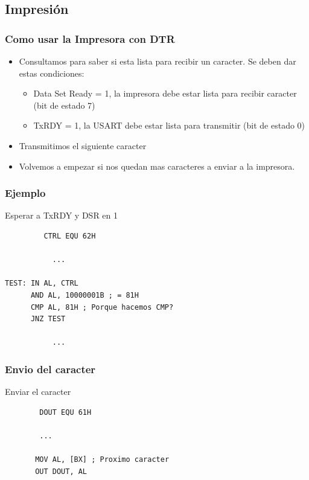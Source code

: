 \documentclass{beamer}
\begin{document}
\subsection{Impresión}

\begin{frame}[fragile]
\frametitle{Como usar la Impresora con DTR}
\begin{itemize}
 \item  Consultamos para saber si esta lista para recibir un caracter. Se deben dar estas condiciones:
 \begin{itemize}
  \item Data Set Ready = 1, la impresora debe estar lista para recibir caracter (bit de estado 7)
  \item TxRDY = 1, la USART debe estar lista para transmitir (bit de estado 0) 
 \end{itemize}
\item Transmitimos el siguiente caracter 
\item Volvemos a empezar si nos quedan mas caracteres a enviar a la impresora.
\end{itemize}

\end{frame}


\begin{frame}[fragile]
\frametitle{Ejemplo}
\begin{block}{Esperar a TxRDY y DSR en 1}
 \begin{verbatim}
         CTRL EQU 62H
         
           ...
           
TEST: IN AL, CTRL
      AND AL, 10000001B ; = 81H
      CMP AL, 81H ; Porque hacemos CMP?
      JNZ TEST
      
           ...
 \end{verbatim}
\end{block}

\end{frame}

\begin{frame}[fragile]
\frametitle{Envio del caracter}
\begin{block}{Enviar el caracter}
 \begin{verbatim}
        DOUT EQU 61H
         
        ...
           
       MOV AL, [BX] ; Proximo caracter
       OUT DOUT, AL
             
 \end{verbatim}
\end{block}

\end{frame}
\end{document}
